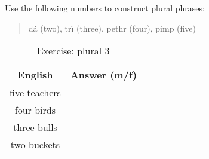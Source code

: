 Use the following numbers to construct plural phrases:\\
\begin{quote}
d\'{a} (two), tr\'{\i} (three), pethr (four), pimp (five)
\end{quote}

\begin{table}[H]
\centering
\begin{tabu}{|c|p{10.0cm}|}
  \toprule
  \textbf{English} & \textbf{Answer (m/f)}\\
  \toprule
  five teachers & \\
  \midrule
  four birds & \\
  \midrule
  three bulls & \\
  \midrule
  two buckets & \\
  \bottomrule
\end{tabu}
\label{exercise_plural_3}
\caption{Exercise: plural 3}
\end{table}

\newpage
\begin{table}[H]
\centering
\label{solution_plural_3}
\caption{Solution: plural 3}
\end{table}
